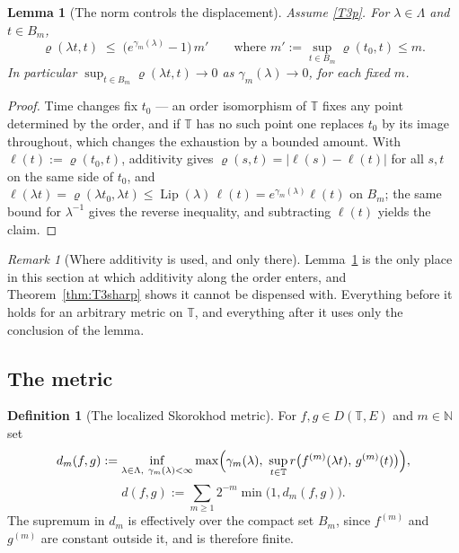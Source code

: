\documentclass[11pt,a4paper]{article}
\theoremstyle{plain}
\newtheorem{lemma}[theorem]{Lemma}
\theoremstyle{definition}
\newtheorem{definition}[theorem]{Definition}
\theoremstyle{remark}
\newtheorem{remark}[theorem]{Remark}
\newcommand{\N}{\mathbb{N}}
\newcommand{\T}{\mathbb{T}}                     %
\DeclareMathOperator{\Lip}{Lip}
\newcommand{\DT}{D(\T,E)}
\begin{document}
\begin{lemma}[The norm controls the displacement]
  \label{lem:tccontrol}
  Assume \eqref{T3p}.  For $\lambda \in \Lambda$ and $t \in B_m$,
  \[
    \varrho(\lambda t, t) \;\leq\; \bigl( e^{\gamma_m(\lambda)} - 1 \bigr)\, m'
    \qquad\text{where } m' := \sup_{t \in B_m} \varrho(t_0, t) \leq m .
  \]
  In particular $\sup_{t \in B_m} \varrho(\lambda t, t) \to 0$ as
  $\gamma_m(\lambda) \to 0$, for each fixed $m$.
\end{lemma}

\begin{proof}
  Time changes fix $t_0$ --- an order isomorphism of $\T$ fixes any point
  determined by the order, and if $\T$ has no such point one replaces $t_0$ by
  its image throughout, which changes the exhaustion by a bounded amount.  With
  $\ell(t) := \varrho(t_0,t)$, additivity gives $\varrho(s,t) = |\ell(s) - \ell(t)|$
  for all $s,t$ on the same side of $t_0$, and
  $\ell(\lambda t) = \varrho(\lambda t_0, \lambda t) \leq \Lip(\lambda)\, \ell(t)
  = e^{\gamma_m(\lambda)} \ell(t)$ on $B_m$; the same bound for
  $\lambda^{-1}$ gives the reverse inequality, and subtracting $\ell(t)$ yields
  the claim.
\end{proof}

\begin{remark}[Where additivity is used, and only there]
  \label{rem:additivityused}
  Lemma~\ref{lem:tccontrol} is the only place in this section at which additivity
  along the order enters, and Theorem~\ref{thm:T3sharp} shows it cannot be
  dispensed with.  Everything before it holds for an arbitrary metric on $\T$,
  and everything after it uses only the conclusion of the lemma.
\end{remark}

\subsection{The metric}
\label{ssec:dcirc}

\begin{definition}[The localized Skorokhod metric]
  \label{def:dcirc}
  For $f,g \in \DT$ and $m \in \N$ set
  \[
    d_m(f,g) := \inf_{\lambda \in \Lambda,\ \gamma_m(\lambda) < \infty}
      \max\Bigl( \gamma_m(\lambda),\
        \sup_{t \in \T} r\bigl( f^{(m)}(\lambda t),\, g^{(m)}(t) \bigr) \Bigr),
  \]
  \[
    d(f,g) := \sum_{m \geq 1} 2^{-m} \min\bigl( 1, d_m(f,g) \bigr).
  \]
  The supremum in $d_m$ is effectively over the compact set $B_m$, since
  $f^{(m)}$ and $g^{(m)}$ are constant outside it, and is therefore finite.
\end{definition}
\end{document}
